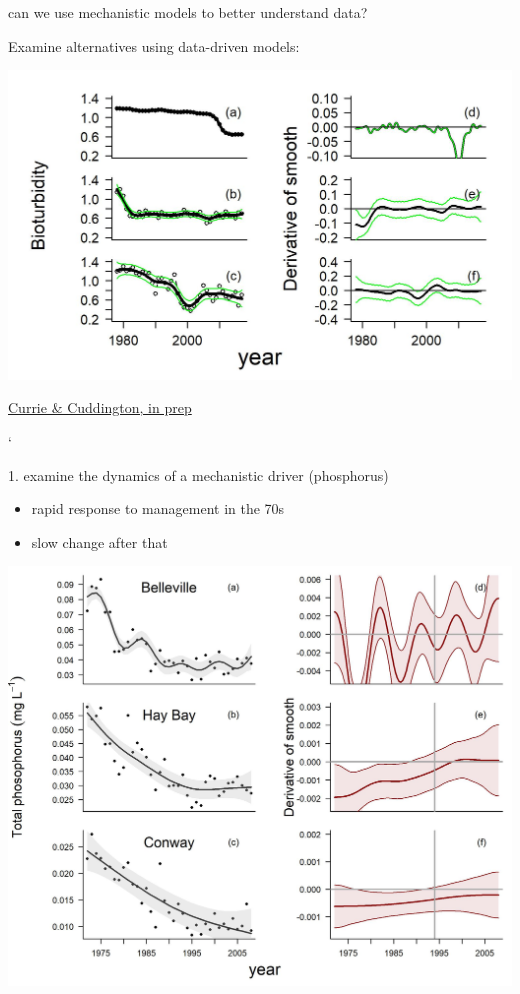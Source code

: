 \documentclass[
  ignorenonframetext,
]{beamer}
\providecommand{\tightlist}{%
  \setlength{\itemsep}{0pt}\setlength{\parskip}{0pt}}
\begin{document}
\begin{frame}{can we use mechanistic models to better understand data?}
\begin{block}{Examine alternatives using data-driven models:}
\begin{center}\includegraphics[width=0.9\linewidth]{schaefferexap} \end{center}

\href{}{Currie \& Cuddington, in prep}

`
\end{block}

\begin{block}{1. examine the dynamics of a mechanistic driver
(phosphorus)}
\protect\hypertarget{examine-the-dynamics-of-a-mechanistic-driver-phosphorus}{}
\begin{itemize}
\tightlist
\item
  rapid response to management in the 70s
\item
  slow change after that
\end{itemize}

\begin{center}\includegraphics[width=1\linewidth]{TPgamApr08} \end{center}


\end{block}
\end{frame}
\end{document}
